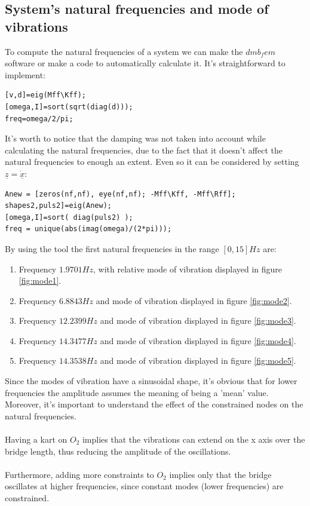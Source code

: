 \documentclass[10pt,a4paper,final]{report}
\begin{document}
\subsection{System's natural frequencies and mode of vibrations}
To compute the natural frequencies of a system we can make the $dmb_fem$ software or make a code to automatically calculate it. It's straightforward to implement:
\begin{lstlisting}
[v,d]=eig(Mff\Kff);
[omega,I]=sort(sqrt(diag(d)));
freq=omega/2/pi;
\end{lstlisting}
It's worth to notice that the damping was not taken into account while calculating the natural frequencies, due to the fact that it doesn't affect the natural frequencies to enough an extent. Even so it can be considered by setting $\underline{z}=\underline{\dot{x}}$:
\begin{lstlisting}
Anew = [zeros(nf,nf), eye(nf,nf); -Mff\Kff, -Mff\Rff];
shapes2,puls2]=eig(Anew);
[omega,I]=sort( diag(puls2) );
freq = unique(abs(imag(omega)/(2*pi)));
\end{lstlisting}
By using the tool the first natural frequencies in the range $[0,15]Hz$ are:
\begin{enumerate}
\item Frequency $1.9701 Hz$, with relative mode of vibration displayed in figure \ref{fig:mode1}.
\item Frequency $6.8843 Hz$ and mode of vibration displayed in figure \ref{fig:mode2}.
\item Frequency $12.2399 Hz$ and mode of vibration displayed in figure \ref{fig:mode3}.
\item Frequency $14.3477 Hz$ and mode of vibration displayed in figure \ref{fig:mode4}.
\item Frequency $14.3538 Hz$ and mode of vibration displayed in figure \ref{fig:mode5}.
\end{enumerate}
Since the modes of vibration have a sinusoidal shape, it's obvious that for lower frequencies the amplitude assumes the meaning of being a 'mean' value. Moreover, it's important to understand the effect of the constrained nodes on the natural frequencies.\\ \\
Having a kart on $O_2$ implies that the vibrations can extend on the x axis over the bridge length, thus reducing the amplitude of the oscillations. \\ \\
Furthermore, adding more constraints to $O_2$ implies only that the bridge oscillates at higher frequencies, since  constant modes (lower frequencies) are constrained. \\ \\
\end{document}
